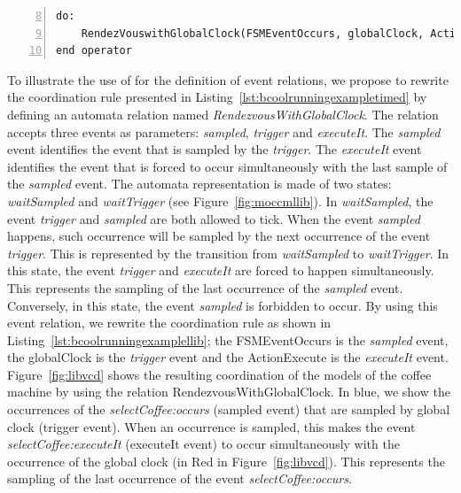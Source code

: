 \begin{lstlisting}[language=bcool,
caption={Synchronized product operator between the TFSM and Activity languages by using the library},
label={lst:bcoolrunningexamplellib}, 
basicstyle=\scriptsize\ttfamily, backgroundcolor=\color{LGrey}, numbers=left, firstnumber=8, xleftmargin=2pt]
do: 
	RendezVouswithGlobalClock(FSMEventOccurs, globalClock, ActionExecute)
end operator
\end{lstlisting}


To illustrate the use of \moccml for the definition of event relations, we propose to rewrite the coordination rule presented in Listing~\ref{lst:bcoolrunningexampletimed} by defining an automata relation named \emph{RendezvousWithGlobalClock}. The relation accepts three events as parameters: \emph{sampled}, \emph{trigger} and \emph{executeIt}. The \emph{sampled} event identifies the event that is sampled by the \emph{trigger}. The \emph{executeIt} event identifies the event that is forced to occur simultaneously with the last sample of the \emph{sampled} event. The automata representation is made of two states: \emph{waitSampled} and \emph{waitTrigger} (see Figure~\ref{fig:moccmllib}). In \emph{waitSampled}, the event \emph{trigger} and \emph{sampled} are both allowed to tick. When the event \emph{sampled} happens, such occurrence will be sampled by the next occurrence of the event \emph{trigger}. This is represented by the transition from \emph{waitSampled} to \emph{waitTrigger}. In this state, the event \emph{trigger} and \emph{executeIt} are forced to happen simultaneously. This represents the sampling of the last occurrence of the \emph{sampled} event. Conversely, in this state, the event \emph{sampled} is forbidden to occur. By using this event relation, we rewrite the coordination rule as shown in Listing~\ref{lst:bcoolrunningexamplellib}; the FSMEventOccurs is the \emph{sampled} event, the globalClock is the \emph{trigger} event and the ActionExecute is the \emph{executeIt} event. Figure~\ref{fig:libvcd} shows the resulting coordination of the models of the coffee machine by using the relation RendezvousWithGlobalClock. In blue, we show the occurrences of the \emph{selectCoffee:occurs} (sampled event) that are sampled by global clock (trigger event). When an occurrence is sampled, this makes the event \emph{selectCoffee:executeIt} (executeIt event) to occur simultaneously with the occurrence of the global clock (in Red in Figure~\ref{fig:libvcd}). This represents the sampling of the last occurrence of the event \emph{selectCoffee:occurs}.   
  
